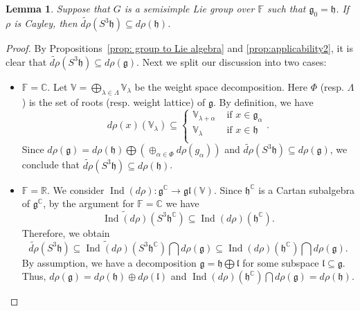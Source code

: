 \documentclass[11pt,reqno]{amsart}
\DeclareMathOperator{\Ind}{Ind}
\newtheorem{lemma}[theorem]{Lemma}
\newcommand{\CC}{\mathbb{C}} %
\newcommand{\FF}{\mathbb{F}} %
\begin{document}
\begin{lemma}\label{lem: a3 to a}
Suppose that $G$ is a semisimple Lie group over $\mathbb{F}$ such that $\mathfrak{g}_0 = \mathfrak{h}$.  If $\rho$ is Cayley,  then $\widetilde{d\rho} \left( S^3\mathfrak{h}\right) \subseteq d\rho(\mathfrak{h})$. 
\end{lemma}
\begin{proof}
By Propositions~\ref{prop: group to Lie algebra} and \ref{prop:applicability2},  it is clear that $\widetilde{d\rho}  \left( S^3 \mathfrak{h} \right) \subseteq d\rho(\mathfrak{g})$.  Next we split our discussion into two cases: 
\begin{itemize}
\item[$\diamond$] $\FF=\CC$.  Let $\mathbb{V} = \bigoplus_{\lambda \in \Lambda} \mathbb{V}_{\lambda}$ be the weight space decomposition.  Here $\Phi$ (resp.  $\Lambda$) is the set of roots (resp.  weight lattice) of $\mathfrak{g}$.  By definition,  we have 
\[
d\rho (x) (\mathbb{V}_{\lambda}) \subseteq \begin{cases}
\mathbb{V}_{\lambda + \alpha} &\text{~if~}x \in \mathfrak{g}_{\alpha} \\
\mathbb{V}_{\lambda} &\text{~if~}x \in \mathfrak{h} \\
\end{cases}.
\]
Since $d\rho (\mathfrak{g}) = d\rho (\mathfrak{h}) \bigoplus \left( \oplus_{\alpha \in \Phi} d\rho (g_{\alpha}) \right)$ and $\widetilde{d\rho}  \left( S^3 \mathfrak{h} \right) \subseteq d\rho(\mathfrak{g})$,  we conclude that $\widetilde{d\rho}  \left( S^3 \mathfrak{h} \right) \subseteq d\rho(\mathfrak{h})$.
\item[$\diamond$] $\mathbb{F} = \mathbb{R}$.  We consider $\Ind(d\rho): \mathfrak{g}^{\mathbb{C}} \to \mathfrak{gl}(\mathbb{V})$.  Since $\mathfrak{h}^{\mathbb{C}}$ is a Cartan subalgebra of $\mathfrak{g}^{\mathbb{C}}$,  by the argument for $\mathbb{F} = \mathbb{C}$ we have 
\[
\widetilde{\Ind(d\rho)} \left( S^3  \mathfrak{h}^{\mathbb{C}} \right) \subseteq \Ind(d\rho) \left( \mathfrak{h}^{\mathbb{C}} \right).
\]
Therefore,  we obtain 
\[
\widetilde{d\rho} \left( S^3 \mathfrak{h} \right) \subseteq  \widetilde{\Ind(d\rho)} \left( S^3  \mathfrak{h}^{\mathbb{C}}  \right) \bigcap d\rho (\mathfrak{g}) \subseteq \Ind(d\rho) \left( \mathfrak{h}^{\mathbb{C}} \right) \bigcap d\rho (\mathfrak{g}).
\]
By assumption,  we have a decomposition $\mathfrak{g} = \mathfrak{h} \bigoplus \mathfrak{l}$ for some subspace $\mathfrak{l} \subseteq \mathfrak{g}$.  Thus,  $d\rho (\mathfrak{g}) = d \rho (\mathfrak{h}) \oplus d \rho (\mathfrak{l})$ and $\Ind(d\rho) \left( \mathfrak{h}^{\mathbb{C}} \right) \bigcap d\rho (\mathfrak{g}) = d\rho (\mathfrak{h})$.  \qedhere
\end{itemize}
\end{proof}
\end{document}
